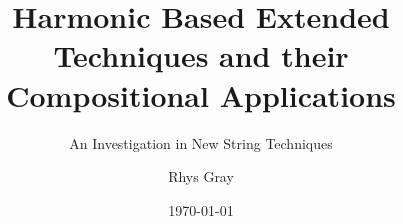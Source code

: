 \documentclass{turabian-thesis}
\title{Harmonic Based Extended Techniques and their Compositional Applications}
\subtitle{An Investigation in New String Techniques}
\author{Rhys Gray}
\date{\today}
\begin{document}
\frontmatter{}
\maketitle



\tableofcontents{}
\listofillustrations{}

\mainmatter{}







\backmatter{}

\begin{appendixes}
    
    
    
    
    
    
\end{appendixes}

\printbibliography{}
\end{document}
